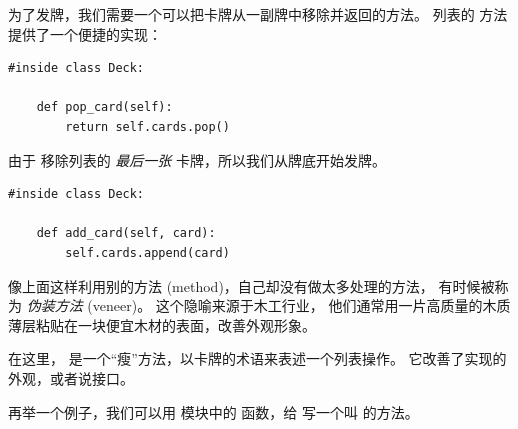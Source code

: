为了发牌，我们需要一个可以把卡牌从一副牌中移除并返回的方法。
列表的  方法提供了一个便捷的实现：


\begin{lstlisting}
#inside class Deck:

    def pop_card(self):
        return self.cards.pop()
\end{lstlisting}


由于  移除列表的 {\em 最后一张} 卡牌，所以我们从牌底开始发牌。



\begin{lstlisting}
#inside class Deck:

    def add_card(self, card):
        self.cards.append(card)
\end{lstlisting}


像上面这样利用别的方法 (method)，自己却没有做太多处理的方法，
有时候被称为 {\em 伪装方法} (veneer)。  
这个隐喻来源于木工行业， 他们通常用一片高质量的木质薄层粘贴在一块便宜木材的表面，改善外观形象。



在这里， 是一个“瘦”方法，以卡牌的术语来表述一个列表操作。  
它改善了实现的外观，或者说接口。


再举一个例子，我们可以用  模块中的 
 函数，给  写一个叫  的方法。


